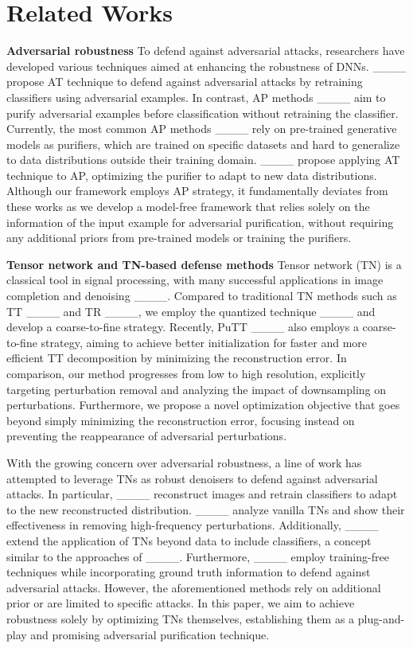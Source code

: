 \section{Related Works}
\label{Related}
\textbf{Adversarial robustness} \quad To defend against adversarial attacks, researchers have developed various techniques aimed at enhancing the robustness of DNNs.
____ propose AT technique to defend against adversarial attacks by retraining classifiers using adversarial examples. In contrast, AP methods ____ aim to purify adversarial examples before classification without retraining the classifier. Currently, the most common AP methods ____ rely on pre-trained generative models as purifiers, which are trained on specific datasets and hard to generalize to data distributions outside their training domain. ____ propose applying AT technique to AP, optimizing the purifier to adapt to new data distributions.
Although our framework employs AP strategy, it fundamentally deviates from these works as we develop a model-free framework that relies solely on the information of the input example for adversarial purification, without requiring any additional priors from pre-trained models or training the purifiers.


\textbf{Tensor network and TN-based defense methods} \quad Tensor network (TN) is a classical tool in signal processing, with many successful applications in image completion and denoising ____.
Compared to traditional TN methods such as TT ____ and TR ____, we employ the quantized technique ____ and develop a coarse-to-fine strategy. Recently, PuTT ____ also employs a coarse-to-fine strategy, aiming to achieve better initialization for faster and more efficient TT decomposition by minimizing the reconstruction error.
In comparison, our method progresses from low to high resolution, explicitly targeting perturbation removal and analyzing the impact of downsampling on perturbations. Furthermore, we propose a novel optimization objective that goes beyond simply minimizing the reconstruction error, focusing instead on preventing the reappearance of adversarial perturbations.

With the growing concern over adversarial robustness, a line of work has attempted to leverage TNs as robust denoisers to defend against adversarial attacks. In particular, ____ reconstruct images and retrain classifiers to adapt to the new reconstructed distribution. ____ analyze vanilla TNs and show their effectiveness in removing high-frequency perturbations.
Additionally, ____ extend the application of TNs beyond data to include classifiers, a concept similar to the approaches of ____. Furthermore, ____ employ training-free techniques while incorporating ground truth information to defend against adversarial attacks. However, the aforementioned methods rely on additional prior or are limited to specific attacks.
In this paper, we aim to achieve robustness solely by optimizing TNs themselves, establishing them as a plug-and-play and promising adversarial purification technique.